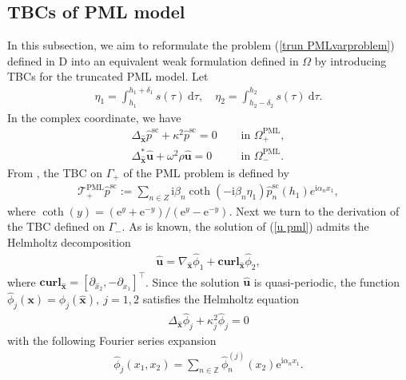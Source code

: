 \documentclass[final,3p,times]{elsarticle}
\begin{document}
\subsection{TBCs of PML model}
In this subsection, we aim to reformulate the problem (\ref{trun PMLvarproblem}) defined in $\mathrm{D}$ into an equivalent weak formulation defined in $\Omega$ by introducing TBCs for the truncated PML model. Let
\begin{align}\label{3.2.1}
	\eta_1=\int_{h_1}^{h_1+\delta_1} s(\tau) \mathrm{~d} \tau,\quad
	\eta_2=\int_{h_2-\delta_2}^{h_2} s(\tau) \mathrm{~d} \tau.
\end{align}
In the complex coordinate,  we have 
\begin{align}
	\Delta_{\hat{\boldsymbol{x}}} \hat{p}^\mathrm{sc} + \kappa^2 \hat{p}^\mathrm{sc}=0 &\quad \text { in }  \Omega^{\mathrm{PML}}_+, \label{p pml}\\
	\Delta^*_{\hat{\boldsymbol{x}}}\hat{\boldsymbol{u}} +  \omega^2\rho\hat{\boldsymbol{u}} = 0 &\quad \text { in }  \Omega^{\mathrm{PML}}_-.\label{u pml}
\end{align}
From \cite{Chen03}, the TBC  on $\Gamma_+$ of the PML problem is defined by
\begin{align}\label{p PML-TBC}
	\mathscr{T}_+^{\mathrm{PML}} \hat{p}^\mathrm{sc} :=\sum_{n \in Z} \mathrm{i} \beta_n \operatorname{coth}\left(-\mathrm{i} \beta_n \eta_1\right) \hat{p}^\mathrm{sc}_{n}(h_1) e^{\mathrm{i}\alpha_n x_1},
\end{align}
where $\operatorname{coth}(y)=\left(\mathrm{e}^y+\mathrm{e}^{-y}\right) /\left(\mathrm{e}^y-\mathrm{e}^{-y}\right)$. 
Next we turn to the derivation of the TBC defined on $\Gamma_-$. As is known, the solution of (\ref{u pml}) admits the Helmholtz decomposition
\begin{align}\label{PML decomp}
	\hat{\boldsymbol{u}}=\nabla_{\hat{\boldsymbol{x}}} \hat{\phi}_1+\textbf{curl} _{\hat{\boldsymbol{x}}} \hat{\phi}_2,
\end{align}
where 
$\textbf{curl}_{\hat{\boldsymbol{x}}}=\left[\partial_{\hat{x}_2},-\partial_{x_1}\right]^{\top}$. Since the solution $\hat{\boldsymbol{u}}$ is quasi-periodic, the function $\hat{\phi}_j(\boldsymbol{x})=\phi_j(\hat{\boldsymbol{x}}),~ j = 1,2$ satisfies the Helmholtz equation
\begin{align}\label{4.1}
	\Delta_{\hat{\boldsymbol{x}}} \hat{\phi}_j+\kappa_j^2 \hat{\phi}_j=0
\end{align}
with the following Fourier series expansion 
\begin{align}\label{4.2}
	\hat{\phi}_j(x_1, x_2)=\sum_{n \in \mathbb{Z}} \hat{\phi}_n^{(j)}(x_2) \mathrm{e}^{\mathrm{i} \alpha_n x_1}.
\end{align}
\end{document}
